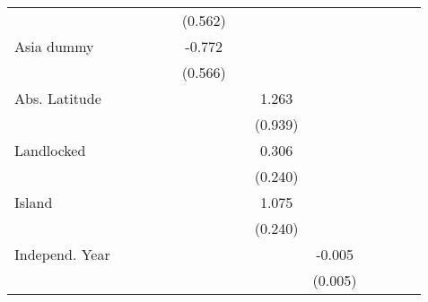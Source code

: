 \begin{sidewaystable}[h!]
\begin{threeparttable}
\begin{center}
\begin{minipage}{\textwidth}
\begin{tabular*}{\textwidth}{@{\extracolsep{\fill}}lcccccccccccc@{\extracolsep{\fill}}}
            &                     &                     &                     &                     &     (0.562)         &                     &                     &                     &                     \\
[0.125em]
Asia dummy        &                     &                     &                     &                     &      -0.772         &                     &                     &                     &                     \\
            &                     &                     &                     &                     &     (0.566)         &                     &                     &                     &                     \\
[0.125em]
Abs. Latitude    &                     &                     &                     &                     &                     &                     &       1.263 &                     &                     \\
            &                     &                     &                     &                     &                     &                     &     (0.939)         &                     &                     \\
[0.125em]
Landlocked    &                     &                     &                     &                     &                     &                     &       0.306         &                     &                     \\
            &                     &                     &                     &                     &                     &                     &     (0.240)         &                     &                     \\
[0.125em]
Island    &                     &                     &                     &                     &                     &                     &       1.075\sym{***}&                     &                     \\
            &                     &                     &                     &                     &                     &                     &     (0.240)         &                     &                     \\
[0.125em]
Independ. Year &                     &                     &                     &                     &                     &                     &                     &    -0.005         &                     \\
            &                     &                     &                     &                     &                     &                     &                     &   (0.005)         &                     \\

\end{tabular*}
\end{minipage}
\end{center}
\end{threeparttable}
\end{sidewaystable}
